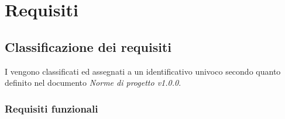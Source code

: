 \documentclass[AnalisiDeiRequisiti.tex]{subfiles}
\begin{document}

\chapter{Requisiti}
\section{Classificazione dei requisiti}
I  vengono classificati ed assegnati a un identificativo univoco secondo quanto definito nel documento \textit{Norme di progetto v1.0.0}.


\subsection{Requisiti funzionali}
\end{document}
